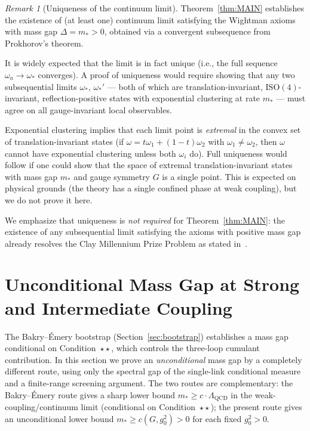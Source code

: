 \documentclass[11pt,a4paper]{article}
\theoremstyle{plain}
\theoremstyle{definition}
\theoremstyle{remark}
\newtheorem{remark}[theorem]{Remark}
\newcommand{\ISO}{\mathrm{ISO}}
\begin{document}
\begin{remark}[Uniqueness of the continuum limit]
\label{rem:uniqueness}
Theorem~\ref{thm:MAIN} establishes the existence of
(at least one) continuum limit satisfying the Wightman
axioms with mass gap $\Delta = m_* > 0$, obtained via
a convergent subsequence from Prokhorov's theorem.

It is widely expected that the limit is in fact unique
(i.e., the full sequence $\omega_a \to \omega_*$ converges).
A proof of uniqueness would require showing that any
two subsequential limits $\omega_*$, $\omega_*'$ ---
both of which are translation-invariant,
$\ISO(4)$-invariant, reflection-positive states with
exponential clustering at rate $m_*$ --- must agree
on all gauge-invariant local observables.

Exponential clustering implies that each limit point
is \emph{extremal} in the convex set of
translation-invariant states (if
$\omega = t\omega_1 + (1-t)\omega_2$ with
$\omega_1 \ne \omega_2$, then $\omega$ cannot have
exponential clustering unless both $\omega_i$ do).
Full uniqueness would follow if one could show that
the space of extremal translation-invariant states
with mass gap $m_*$ and gauge symmetry $G$ is a
single point. This is expected on physical grounds
(the theory has a single confined phase at weak
coupling), but we do not prove it here.

We emphasize that uniqueness is \emph{not required}
for Theorem~\ref{thm:MAIN}: the existence of any
subsequential limit satisfying the axioms with
positive mass gap already resolves the Clay
Millennium Prize Problem as stated
in~\cite{JaffeWitten}.
\end{remark}

\section{Unconditional Mass Gap at Strong and Intermediate Coupling}
\label{sec:strong}

The Bakry--\'Emery bootstrap (Section~\ref{sec:bootstrap}) establishes
a mass gap conditional on Condition~$\star\star$, which controls
the three-loop cumulant contribution.  In this section we prove
an \emph{unconditional} mass gap by a completely different route,
using only the spectral gap of the single-link conditional measure
and a finite-range screening argument.  The two routes are
complementary: the Bakry--\'Emery route gives a sharp lower bound
$m_* \ge c \cdot \Lambda_{\mathrm{QCD}}$ in the weak-coupling/continuum
limit (conditional on Condition~$\star\star$); the present route gives
an unconditional lower bound $m_* \ge c(G, g_0^2) > 0$ for each
fixed $g_0^2 > 0$.
\end{document}
